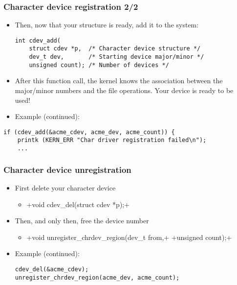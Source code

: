 \begin{frame}[fragile]
  \frametitle{Character device registration 2/2}
  \begin{itemize}
  \item Then, now that your structure is ready, add it to the system:
\begin{verbatim}
int cdev_add(
    struct cdev *p,  /* Character device structure */
    dev_t dev,       /* Starting device major/minor */
    unsigned count); /* Number of devices */
\end{verbatim}
  \item After this function call, the kernel knows the association
  between the major/minor numbers and the file operations. Your device
  is ready to be used!
  \item Example (continued):
\end{itemize}
\begin{verbatim}
if (cdev_add(&acme_cdev, acme_dev, acme_count)) {
    printk (KERN_ERR "Char driver registration failed\n");
    ...
\end{verbatim}
\end{frame}

\begin{frame}[fragile]
  \frametitle{Character device unregistration}
  \begin{itemize}
  \item First delete your character device
    \begin{itemize}
    \item {}+void cdev_del(struct cdev *p);+
    \end{itemize}
  \item Then, and only then, free the device number
    \begin{itemize}
    \item {}+void unregister_chrdev_region(dev_t from,+
      +unsigned count);+
    \end{itemize}
  \item Example (continued):
\begin{verbatim}
cdev_del(&acme_cdev);
unregister_chrdev_region(acme_dev, acme_count);
\end{verbatim}
  \end{itemize}
\end{frame}

